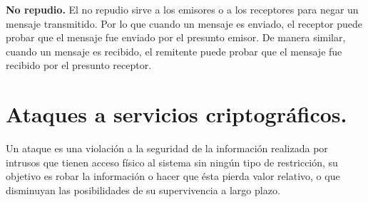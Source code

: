 \textbf{No repudio. }
El no repudio sirve a los emisores o a los receptores para negar un mensaje transmitido. Por lo que cuando un mensaje es enviado, el receptor puede probar que el mensaje fue enviado por el presunto emisor. De manera similar, cuando un mensaje es recibido, el remitente puede probar que el mensaje fue recibido por el presunto receptor.  ~\cite{norepudio}


\section{Ataques a servicios criptográficos. }
Un ataque es una violación a la seguridad de la información realizada por intrusos que tienen acceso físico al sistema sin ningún tipo de restricción, su objetivo es robar la información o hacer que ésta pierda valor relativo, o que disminuyan las posibilidades de su supervivencia a largo plazo.


